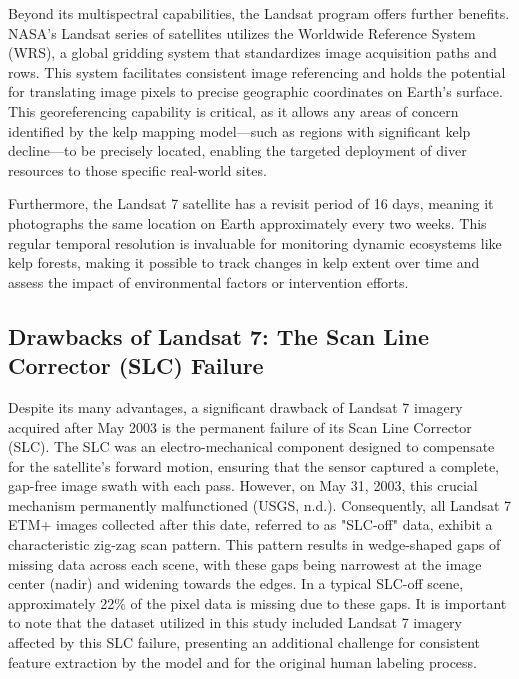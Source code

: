 \documentclass{article}
\begin{document}
Beyond its multispectral capabilities, the Landsat program offers further benefits. NASA's Landsat series of satellites utilizes the Worldwide Reference System (WRS), a global gridding system that standardizes image acquisition paths and rows. This system facilitates consistent image referencing and holds the potential for translating image pixels to precise geographic coordinates on Earth's surface. This georeferencing capability is critical, as it allows any areas of concern identified by the kelp mapping model—such as regions with significant kelp decline—to be precisely located, enabling the targeted deployment of diver resources to those specific real-world sites. 
        
Furthermore, the Landsat 7 satellite has a revisit period of 16 days, meaning it photographs the same location on Earth approximately every two weeks. This regular temporal resolution is invaluable for monitoring dynamic ecosystems like kelp forests, making it possible to track changes in kelp extent over time and assess the impact of environmental factors or intervention efforts.

\subsection{Drawbacks of Landsat 7: The Scan Line Corrector (SLC) Failure} 

Despite its many advantages, a significant drawback of Landsat 7 imagery acquired after May 2003 is the permanent failure of its Scan Line Corrector (SLC). The SLC was an electro-mechanical component designed to compensate for the satellite's forward motion, ensuring that the sensor captured a complete, gap-free image swath with each pass. However, on May 31, 2003, this crucial mechanism permanently malfunctioned (USGS, n.d.). Consequently, all Landsat 7 ETM+ images collected after this date, referred to as "SLC-off" data, exhibit a characteristic zig-zag scan pattern. This pattern results in wedge-shaped gaps of missing data across each scene, with these gaps being narrowest at the image center (nadir) and widening towards the edges. In a typical SLC-off scene, approximately 22\% of the pixel data is missing due to these gaps. It is important to note that the dataset utilized in this study included Landsat 7 imagery affected by this SLC failure, presenting an additional challenge for consistent feature extraction by the model and for the original human labeling process.
\end{document}
